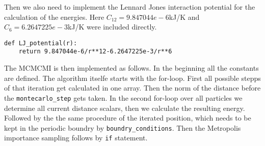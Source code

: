 \documentclass{article}[a4paper]
\begin{document}
Then we also need to implement the Lennard Jones interaction potential for the calculation of the energies. Here $C_{12}=9.847044e-6$kJ/K and $C_{6}=6.2647225e-3$kJ/K were included directly.
\begin{lstlisting}
def LJ_potential(r):
    return 9.847044e-6/r**12-6.2647225e-3/r**6 
\end{lstlisting}

The MCMCMI is then implemented as follows. In the beginning all the constants are defined. 
The algorithm itselfe starts with the for-loop. First all possible stepps of that iteration get calculated in one array. 
Then the norm of the distance before the \texttt{montecarlo\_step} gets taken.
In the second for-loop over all particles we determine all current distance scalars, then we calculate the resulting energy.
Followed by the the same procedure of the iterated position, which needs to be kept in the periodic boundry by \texttt{boundry\_conditions}.
Then the Metropolis importance sampling follows by \texttt{if} statement. 
\end{document}
